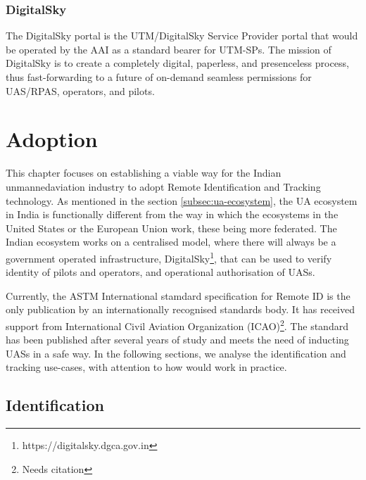 \documentclass{ua_wgs_base}
\begin{document}
\subsection{DigitalSky}

The DigitalSky portal is the UTM/DigitalSky Service Provider portal
that would be operated by the AAI as a standard bearer for UTM-SPs.
The mission of DigitalSky is to create a completely digital, paperless,
and presenceless process, thus fast-forwarding to a future of on-demand
seamless permissions for UAS/RPAS,
operators, and pilots.

\cleardoublepage{}

\chapter{Adoption}

This chapter focuses on establishing a viable way for the Indian unmannedaviation
industry to adopt Remote Identification and Tracking technology. As
mentioned in the section \ref{subsec:ua-ecosystem}, the UA ecosystem
in India is functionally different from the way in which the ecosystems
in the United States or the European Union work, these being more
federated. The Indian ecosystem works on a centralised model, where
there will always be a government operated infrastructure, DigitalSky\footnote{https://digitalsky.dgca.gov.in},
that can be used to verify identity of pilots and operators, and operational
authorisation of UASs.

Currently, the ASTM International stamdard specification for Remote
ID \cite{ASTM:F3411:19} is the only publication by an internationally
recognised standards body. It has received support from International
Civil Aviation Organization (ICAO)\footnote{Needs citation}.
The standard has been published after several years of study and meets
the need of inducting UASs in a safe way. In the following sections,
we analyse the identification and tracking use-cases, with attention
to how \cite{ASTM:F3411:19} would work in practice.

\section{Identification}
\end{document}

